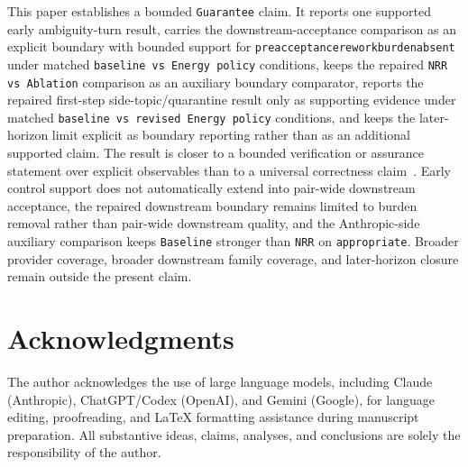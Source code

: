 \documentclass[11pt]{article}
\renewcommand{\_}{\textunderscore\hspace{0pt}}
\begin{document}
This paper establishes a bounded \texttt{Guarantee} claim. It reports one
supported early ambiguity-turn result, carries the downstream-acceptance
comparison as an explicit boundary with bounded support for
\texttt{preacceptance\_rework\_burden\_absent} under matched
\texttt{baseline vs Energy policy} conditions, keeps the repaired
\texttt{NRR vs Ablation} comparison as an auxiliary boundary comparator,
reports the repaired first-step side-topic/quarantine result only as
supporting evidence under matched \texttt{baseline vs revised Energy policy}
conditions, and keeps the later-horizon limit explicit as boundary reporting
rather than as an additional supported claim. The result is closer to a bounded
verification or assurance statement over explicit observables than to a
universal correctness claim~\cite{seshia2022verifiedai,desai2019soter}. Early
control support does not automatically extend into pair-wide downstream
acceptance, the repaired downstream boundary remains limited to burden removal
rather than pair-wide downstream quality, and the Anthropic-side auxiliary
comparison keeps \texttt{Baseline} stronger than \texttt{NRR} on
\texttt{appropriate}. Broader provider coverage, broader downstream family
coverage, and later-horizon closure remain outside the present claim.

\section*{Acknowledgments}
The author acknowledges the use of large language models, including Claude
(Anthropic), ChatGPT/Codex (OpenAI), and Gemini (Google), for language
editing, proofreading, and LaTeX formatting assistance during manuscript
preparation. All substantive ideas, claims, analyses, and conclusions are
solely the responsibility of the author.
\end{document}
